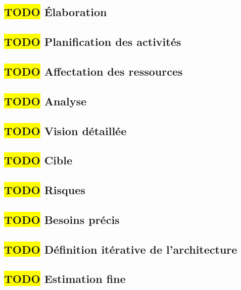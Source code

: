 \textcolor[RGB]{46, 116, 181}{\chapter{\colorbox{yellow}{TODO} Élaboration}}
\section{\colorbox{yellow}{TODO} Planification des activités}

\section{\colorbox{yellow}{TODO} Affectation des ressources}

\section{\colorbox{yellow}{TODO} Analyse}

\section{\colorbox{yellow}{TODO} Vision détaillée}

\section{\colorbox{yellow}{TODO} Cible}

\section{\colorbox{yellow}{TODO} Risques}

\section{\colorbox{yellow}{TODO} Besoins précis}

\section{\colorbox{yellow}{TODO} Définition itérative de l'architecture}

\section{\colorbox{yellow}{TODO} Estimation fine}
